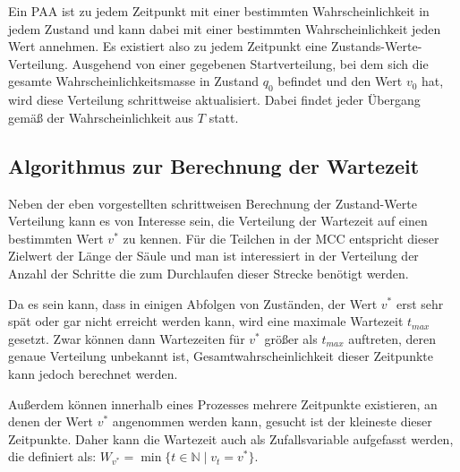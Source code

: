 Ein PAA ist zu jedem Zeitpunkt mit einer bestimmten Wahrscheinlichkeit in jedem Zustand und kann dabei mit einer bestimmten Wahrscheinlichkeit jeden Wert annehmen. Es existiert also zu jedem Zeitpunkt eine Zustands-Werte-Verteilung. Ausgehend von einer gegebenen Startverteilung, bei dem sich die gesamte Wahrscheinlichkeitsmasse in Zustand $q_0$ befindet und den Wert $v_0$ hat, wird diese Verteilung schrittweise aktualisiert. Dabei findet jeder Übergang gemäß der Wahrscheinlichkeit aus $T$ statt. %

% 
% 
% 

\subsection{Algorithmus zur Berechnung der Wartezeit}

Neben der eben vorgestellten schrittweisen Berechnung der Zustand-Werte Verteilung kann es von Interesse sein, die Verteilung der Wartezeit auf einen bestimmten Wert $v^*$ zu kennen. Für die Teilchen in der MCC entspricht dieser Zielwert der Länge der Säule und man ist interessiert in der Verteilung der Anzahl der Schritte die zum Durchlaufen dieser Strecke benötigt werden. 

Da es sein kann, dass in einigen Abfolgen von Zuständen, der Wert $v^*$ erst sehr spät oder gar nicht erreicht werden kann, wird eine maximale Wartezeit $t_{max}$ gesetzt. Zwar können dann Wartezeiten für $v^*$ größer als $t_{max}$ auftreten, deren genaue Verteilung unbekannt ist, Gesamtwahrscheinlichkeit dieser Zeitpunkte kann jedoch berechnet werden.

Außerdem können innerhalb eines Prozesses mehrere Zeitpunkte existieren, an denen der Wert $v^*$ angenommen werden kann, gesucht ist der kleineste dieser Zeitpunkte. %
Daher kann die Wartezeit auch als Zufallsvariable aufgefasst werden, die definiert als: $W_{v^*} = \min\{t \in \mathbb{N}\mid v_t = v^*\}$.

